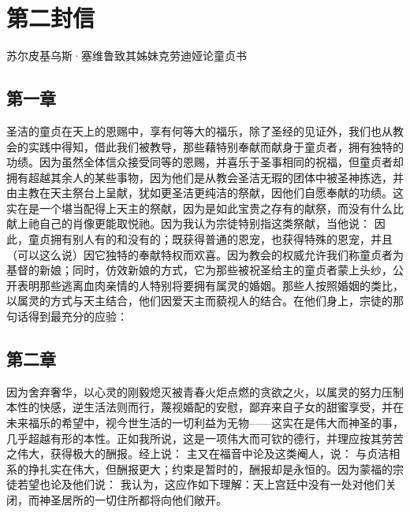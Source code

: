 
\section{第二封信}

苏尔皮基乌斯·塞维鲁致其姊妹克劳迪娅论童贞书\par


\subsection{第一章}

圣洁的童贞在天上的恩赐中，享有何等大的福乐，除了圣经的见证外，我们也从教会的实践中得知，借此我们被教导，那些藉特别奉献而献身于童贞者，拥有独特的功绩。因为虽然全体信众接受同等的恩赐，并喜乐于圣事相同的祝福，但童贞者却拥有超越其余人的某些事物，因为他们是从教会圣洁无瑕的团体中被圣神拣选，并由主教在天主祭台上呈献，犹如更圣洁更纯洁的祭献，因他们自愿奉献的功绩。这实在是一个堪当配得上天主的祭献，因为是如此宝贵之存有的献祭，而没有什么比献上祂自己的肖像更能取悦祂。因为我认为宗徒特别指这类祭献，当他说： 因此，童贞拥有别人有的和没有的；既获得普通的恩宠，也获得特殊的恩宠，并且（可以这么说）因它独特的奉献特权而欢喜。因为教会的权威允许我们称童贞者为基督的新娘；同时，仿效新娘的方式，它为那些被祝圣给主的童贞者蒙上头纱，公开表明那些逃离血肉亲情的人特别将要拥有属灵的婚姻。那些人按照婚姻的类比，以属灵的方式与天主结合，他们因爱天主而藐视人的结合。在他们身上，宗徒的那句话得到最充分的应验：\par


\subsection{第二章}

因为舍弃奢华，以心灵的刚毅熄灭被青春火炬点燃的贪欲之火，以属灵的努力压制本性的快感，逆生活法则而行，蔑视婚配的安慰，鄙弃来自子女的甜蜜享受，并在未来福乐的希望中，视今世生活的一切利益为无物——这实在是伟大而神圣的事，几乎超越有形的本性。正如我所说，这是一项伟大而可钦的德行，并理应按其劳苦之伟大，获得极大的酬报。经上说： 主又在福音中论及这类阉人，说： 与贞洁相系的挣扎实在伟大，但酬报更大；约束是暂时的，酬报却是永恒的。因为蒙福的宗徒若望也论及他们说： 我认为，这应作如下理解：天上宫廷中没有一处对他们关闭，而神圣居所的一切住所都将向他们敞开。\par

